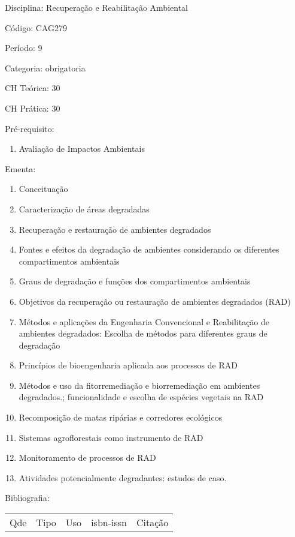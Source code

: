 \documentclass[12pt,a4paper,twoside]{report}
\begin{document}
Disciplina: Recuperação e Reabilitação Ambiental

Código: CAG279

Período: 9

Categoria: obrigatoria

CH Teórica: 30

CH Prática: 30




Pré-requisito:
\begin{enumerate}
\item Avaliação de Impactos Ambientais
\end{enumerate}

Ementa:
\begin{enumerate}
\item Conceituação
\item Caracterização de áreas degradadas
\item Recuperação e restauração de ambientes degradados
\item Fontes e efeitos da degradação de ambientes considerando os diferentes compartimentos ambientais
\item Graus de degradação e funções dos compartimentos ambientais
\item Objetivos da recuperação ou restauração de ambientes degradados (RAD)
\item Métodos e aplicações da Engenharia Convencional e Reabilitação de ambientes degradados: Escolha de métodos para diferentes graus de degradação
\item Princípios de bioengenharia aplicada aos processos de RAD
\item Métodos e uso da fitorremediação e biorremediação em ambientes degradados.; funcionalidade e escolha de espécies vegetais na RAD
\item Recomposição de matas ripárias e corredores ecológicos
\item Sistemas agroflorestais como instrumento de RAD
\item Monitoramento de processos de RAD
\item Atividades potencialmente degradantes: estudos de caso.
\end{enumerate}



Bibliografia:


\begin{tabular}{llllp{8cm}}
Qde & Tipo & Uso & isbn-issn & Citação \\
\end{tabular}
\end{document}

